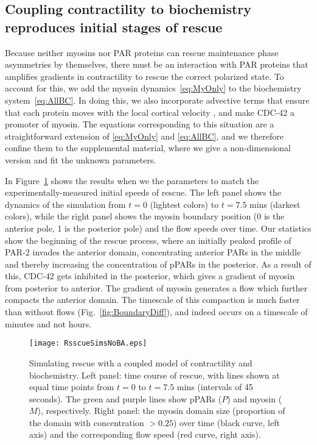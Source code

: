 \documentclass[11pt]{article}
\newcommand{\6}[1]{#1_{\text{6}}}
\newcommand{\3}[1]{#1_{\text{3}}}
\begin{document}
\subsection{Coupling contractility to biochemistry reproduces initial stages of rescue \label{sec:WithMy}}
Because neither myosins nor PAR proteins can rescue maintenance phase asymmetries by themselves, there must be an interaction with PAR proteins that amplifies gradients in contractility to rescue the correct polarized state. To account for this, we add the myosin dynamics\ \eqref{eq:MyOnly} to the biochemistry system\ \eqref{eq:AllBC}. In doing this, we also incorporate advective terms that ensure that each protein moves with the local cortical velocity \cite{illukkumbura2023design}, and make CDC-42 a promoter of myosin. The equations corresponding to this situation are a straightforward extension of \eqref{eq:MyOnly} and \eqref{eq:AllBC}, and we therefore confine them to the supplemental material, where we give a non-dimensional version and fit the unknown parameters.

In Figure\ \ref{fig:RescueNoBA} shows the results when we the parameters to match the experimentally-measured initial speeds of rescue. The left panel shows the dynamics of the simulation from $t=0$ (lightest colors) to $t=7.5$ mins (darkest colors), while the right panel shows the myosin boundary position (0 is the anterior pole, 1 is the posterior pole) and the flow speeds over time. Our statistics show the beginning of the rescue process, where an initially peaked profile of PAR-2 invades the anterior domain, concentrating anterior PARs in the middle and thereby increasing the concentration of pPARs in the posterior. As a result of this, CDC-42 gets inhibited in the posterior, which gives a gradient of myosin from posterior to anterior. The gradient of myosin generates a flow which further compacts the anterior domain. The timescale of this compaction is much faster than without flows (Fig.\ \ref{fig:BoundaryDiff}), and indeed occurs on a timescale of minutes and not hours.

\begin{figure}
\centering
\texttt{[image: RsscueSimsNoBA.eps]}
\caption{\label{fig:RescueNoBA}Simulating rescue with a coupled model of contractility and biochemistry. Left panel: time course of rescue, with lines shown at equal time points from $t=0$ to $t=7.5$ mins (intervals of 45 seconds). The green and purple lines show pPARs ($P$) and myosin ($M$), respectively. Right panel: the myosin domain size (proportion of the domain with concentration $>0.25$) over time (black curve, left axis) and the corresponding flow speed (red curve, right axis).}
\end{figure}
\end{document}
